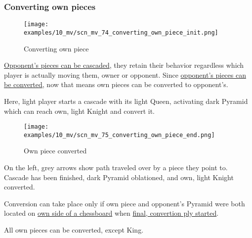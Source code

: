 \subsubsection*{Converting own pieces}
\label{sec:Miranda's veil/Wave/Cascading opponent/Converting own pieces}

\vspace*{-0.7\baselineskip}
\noindent
\begin{wrapfigure}[11]{l}{0.4\textwidth}
\centering
\texttt{[image: examples/10\_mv/scn\_mv\_74\_converting\_own\_piece\_init.png]}
\vspace*{-1.4\baselineskip}
\caption{Converting own piece}
\label{fig:scn_mv_74_converting_own_piece_init}
\end{wrapfigure}
\hyperref[fig:scn_mv_63_wave_cascading_opponent]{Opponent's pieces can be cascaded},
they retain their behavior regardless which player is actually moving them, owner
or opponent. \newline
Since
\hyperref[sec:Mayan Ascendancy/Pyramid/Conversion]{opponent's pieces can be converted},
now that means own pieces can be converted to opponent's.

Here, light player starts a cascade with its light Queen, activating dark Pyramid
which can reach own, light Knight and convert it.

\vspace*{0.7\baselineskip}
\noindent
\begin{wrapfigure}[14]{l}{0.4\textwidth}
\centering
\texttt{[image: examples/10\_mv/scn\_mv\_75\_converting\_own\_piece\_end.png]}
\vspace*{-1.4\baselineskip}
\caption{Own piece converted}
\label{fig:scn_mv_75_converting_own_piece_end}
\end{wrapfigure}
On the left, grey arrows show path traveled over by a piece they point to.
Cascade has been finished, dark Pyramid oblationed, and own, light Knight
converted.

Conversion can take place only if own piece and opponent's Pyramid were both located
on \hyperref[sec:Definitions/Chessboard sides, navigation]{own side of a chessboard}
when
\hyperref[fig:scn_mv_61_converting_opponents_piece_init]{final, convertion ply started}.

All own pieces can be converted, except King.

\clearpage %

